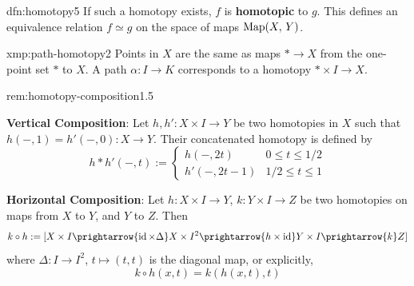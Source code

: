 \documentclass[landscape, 8pt]{extarticle}
\begin{document}
\begin{multicols*}{3}
\vspace{-7pt}
\begin{dfn}[Homotopy]{dfn:homotopy}{5}
	If such a homotopy exists, $f$ is \textbf{homotopic} to $g$. This defines an equivalence relation $f \simeq g$ on the space of maps $\operatorname{Map}(X,\, Y)$.

\end{dfn}

\vspace{-7pt}
\begin{xmp}{xmp:path-homotopy}{2}
	Points in $X$ are the same as maps $\ast \to X$ from the one-point set $\ast$ to $X$. A path $\alpha : I \to K$ corresponds to a homotopy $\ast \times I \to X$.
\end{xmp}

\begin{rem}{rem:homotopy-composition}{1.5}
	\begin{itemize-zero}
	    \item \textbf{Vertical Composition}: Let $h, h' : X \times I \to Y$ be two homotopies in $X$ such that $h(-, 1) = h'(-, 0) : X \to Y$. Their concatenated homotopy is defined by
			\begin{equation}\label{eq:homotopy}
				h \ast h'(-, t) := \begin{cases}
				h(-, 2t) & 0 \le t \le 1 /2\\
				h'(-, 2t - 1) & 1 /2 \le t \le 1
			\end{cases}\end{equation}
		\item \textbf{Horizontal Composition}: Let $h : X \times I \to Y$, $k : Y \times I \to Z$ be two homotopies on maps from $X$ to $Y$, and $Y$ to $Z$. Then
			\begin{equation}
				k \circ h := [X \times I \prightarrow{\Id \times \Delta} X \times I^{2} \prightarrow{h \times \Id} Y \times I \prightarrow{k} Z]
			\end{equation}
			where $\Delta : I \to I^{2}$, $t \mapsto (t, t)$ is the diagonal map, or explicitly,
			\[k \circ h(x, t) = k(h(x, t), t)\]
	\end{itemize-zero}


\end{rem}
\end{multicols*}
\end{document}

